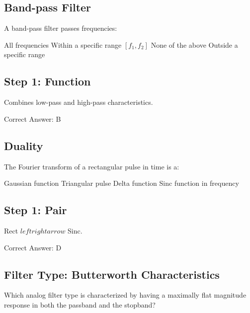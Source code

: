 \clearpage

\subsection{Band-pass Filter}

A band-pass filter passes frequencies:

\begin{choices}
    \choice All frequencies
    \correctchoice Within a specific range $[f_1, f_2]$
    \choice None of the above
    \choice Outside a specific range
\end{choices}

\begin{solution}

\subsection*{Step 1: Function}
Combines low-pass and high-pass characteristics.

Correct Answer: B
\end{solution}

\clearpage

\subsection{Duality}

The Fourier transform of a rectangular pulse in time is a:

\begin{choices}
    \choice Gaussian function
    \choice Triangular pulse
    \choice Delta function
    \correctchoice Sinc function in frequency
\end{choices}

\begin{solution}

\subsection*{Step 1: Pair}
Rect $leftrightarrow$ Sinc.

Correct Answer: D
\end{solution}

\clearpage

\subsection{Filter Type: Butterworth Characteristics}

Which analog filter type is characterized by having a maximally flat magnitude response in both the passband and the stopband?

